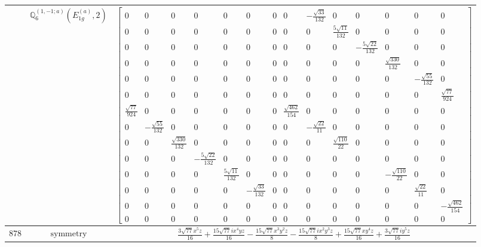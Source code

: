 \documentclass[fleqn,8pt,landscape]{jsarticle}
\begin{document}
\begin{longtable}{ccc}
$  $ & $ \mathbb{Q}_{6}^{(1,-1;a)}(E_{1g}^{(a)},2) $ & $ \begin{bmatrix} 0 & 0 & 0 & 0 & 0 & 0 & 0 & 0 & - \frac{\sqrt{33}}{132} & 0 & 0 & 0 & 0 & 0 \\ 0 & 0 & 0 & 0 & 0 & 0 & 0 & 0 & 0 & \frac{5 \sqrt{11}}{132} & 0 & 0 & 0 & 0 \\ 0 & 0 & 0 & 0 & 0 & 0 & 0 & 0 & 0 & 0 & - \frac{5 \sqrt{22}}{132} & 0 & 0 & 0 \\ 0 & 0 & 0 & 0 & 0 & 0 & 0 & 0 & 0 & 0 & 0 & \frac{\sqrt{330}}{132} & 0 & 0 \\ 0 & 0 & 0 & 0 & 0 & 0 & 0 & 0 & 0 & 0 & 0 & 0 & - \frac{\sqrt{55}}{132} & 0 \\ 0 & 0 & 0 & 0 & 0 & 0 & 0 & 0 & 0 & 0 & 0 & 0 & 0 & \frac{\sqrt{77}}{924} \\ \frac{\sqrt{77}}{924} & 0 & 0 & 0 & 0 & 0 & 0 & \frac{\sqrt{462}}{154} & 0 & 0 & 0 & 0 & 0 & 0 \\ 0 & - \frac{\sqrt{55}}{132} & 0 & 0 & 0 & 0 & 0 & 0 & - \frac{\sqrt{22}}{11} & 0 & 0 & 0 & 0 & 0 \\ 0 & 0 & \frac{\sqrt{330}}{132} & 0 & 0 & 0 & 0 & 0 & 0 & \frac{\sqrt{110}}{22} & 0 & 0 & 0 & 0 \\ 0 & 0 & 0 & - \frac{5 \sqrt{22}}{132} & 0 & 0 & 0 & 0 & 0 & 0 & 0 & 0 & 0 & 0 \\ 0 & 0 & 0 & 0 & \frac{5 \sqrt{11}}{132} & 0 & 0 & 0 & 0 & 0 & 0 & - \frac{\sqrt{110}}{22} & 0 & 0 \\ 0 & 0 & 0 & 0 & 0 & - \frac{\sqrt{33}}{132} & 0 & 0 & 0 & 0 & 0 & 0 & \frac{\sqrt{22}}{11} & 0 \\ 0 & 0 & 0 & 0 & 0 & 0 & 0 & 0 & 0 & 0 & 0 & 0 & 0 & - \frac{\sqrt{462}}{154} \\ 0 & 0 & 0 & 0 & 0 & 0 & 0 & 0 & 0 & 0 & 0 & 0 & 0 & 0 \end{bmatrix} $ \\ \hline
$ 878 $ & $ \text{symmetry} $ & $ \frac{3 \sqrt{77} x^{5} z}{16} + \frac{15 \sqrt{77} i x^{4} y z}{16} - \frac{15 \sqrt{77} x^{3} y^{2} z}{8} - \frac{15 \sqrt{77} i x^{2} y^{3} z}{8} + \frac{15 \sqrt{77} x y^{4} z}{16} + \frac{3 \sqrt{77} i y^{5} z}{16} $ \\

\end{longtable}
\end{document}
